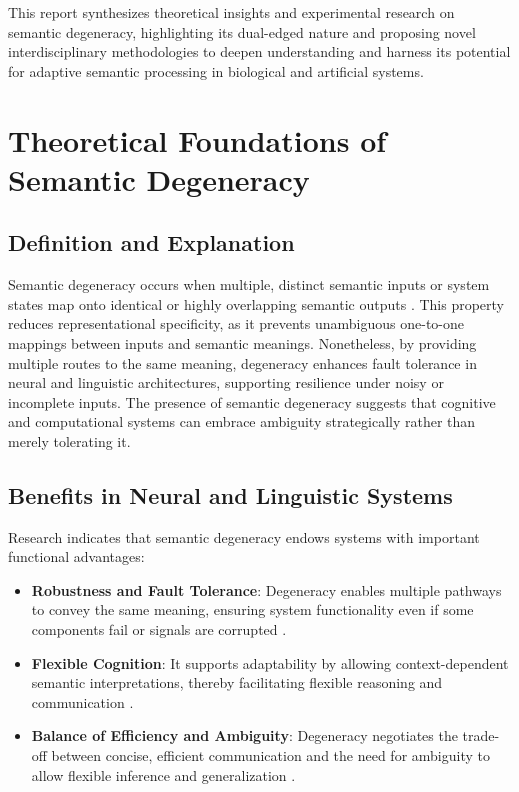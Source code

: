 \documentclass[12pt,a4paper]{article}
\begin{document}
This report synthesizes theoretical insights and experimental research on semantic degeneracy, highlighting its dual-edged nature and proposing novel interdisciplinary methodologies to deepen understanding and harness its potential for adaptive semantic processing in biological and artificial systems.

\section{Theoretical Foundations of Semantic Degeneracy}

\subsection{Definition and Explanation}

Semantic degeneracy occurs when multiple, distinct semantic inputs or system states map onto identical or highly overlapping semantic outputs \cite{citation_needed}. This property reduces representational specificity, as it prevents unambiguous one-to-one mappings between inputs and semantic meanings. Nonetheless, by providing multiple routes to the same meaning, degeneracy enhances fault tolerance in neural and linguistic architectures, supporting resilience under noisy or incomplete inputs. The presence of semantic degeneracy suggests that cognitive and computational systems can embrace ambiguity strategically rather than merely tolerating it.

\subsection{Benefits in Neural and Linguistic Systems}

Research indicates that semantic degeneracy endows systems with important functional advantages:

\begin{itemize}
    \item \textbf{Robustness and Fault Tolerance}: Degeneracy enables multiple pathways to convey the same meaning, ensuring system functionality even if some components fail or signals are corrupted \cite{citation_needed}.
    \item \textbf{Flexible Cognition}: It supports adaptability by allowing context-dependent semantic interpretations, thereby facilitating flexible reasoning and communication \cite{citation_needed}.
    \item \textbf{Balance of Efficiency and Ambiguity}: Degeneracy negotiates the trade-off between concise, efficient communication and the need for ambiguity to allow flexible inference and generalization \cite{citation_needed}.
\end{itemize}
\end{document}
